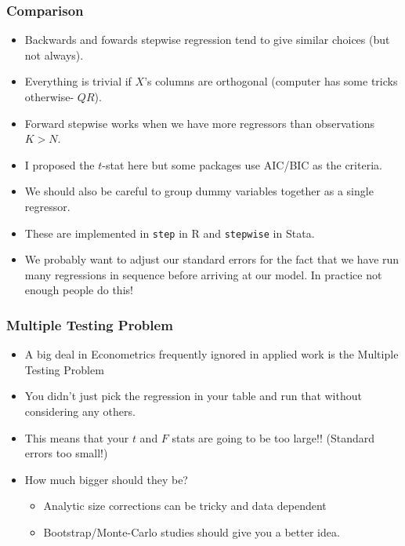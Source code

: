 \documentclass[xcolor=pdftex,dvipsnames,table,mathserif,aspectratio=169]{beamer}
\begin{document}
\begin{frame}
\frametitle{Comparison}
\begin{itemize}
\item Backwards and fowards stepwise regression tend to give similar choices (but not always).
\item Everything is trivial if $X$'s columns are orthogonal (computer has some tricks otherwise- $QR$).
\item Forward stepwise works when we have more regressors than observations $K > N$.
\item I proposed the $t$-stat here but some packages use AIC/BIC as the criteria.
\item We should also be careful to \alert{group dummy variables together} as a single regressor.
\item These are implemented in \texttt{step} in R and \texttt{stepwise} in Stata.
\item We probably want to adjust our standard errors for the fact that we have run many regressions in sequence before arriving at our model. \alert{In practice not enough people do this!}
\end{itemize}
\end{frame}

\begin{frame}
\frametitle{Multiple Testing Problem}
\begin{itemize}
\item A big deal in Econometrics frequently ignored in applied work is the \alert{Multiple Testing Problem}
\item You didn't just pick the regression in your table and run that without considering any others.
\item This means that your $t$ and $F$ stats are going to be too large!! (Standard errors too small!)
\item How much bigger should they be?
\begin{itemize}
\item Analytic size corrections can be tricky and data dependent
\item Bootstrap/Monte-Carlo studies should give you a better idea.
\end{itemize}
\end{itemize}
\end{frame}
\end{document}
